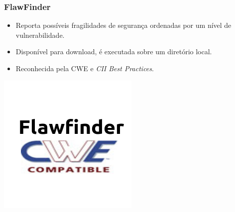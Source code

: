 \documentclass{beamer}
\begin{document}
\begin{frame}
  \frametitle{FlawFinder}

  \begin{minipage}{0.5\textwidth}\centering
    \begin{itemize}
      \item Reporta possíveis fragilidades de segurança ordenadas por um nível de vulnerabilidade.
      \item Disponível para download, é executada sobre um diretório local.
      \item Reconhecida pela CWE e
      \textit{CII Best Practices}.
    \end{itemize}
  \end{minipage}
  \hfill
  \begin{minipage}{0.4\textwidth}\raggedleft

  \includegraphics[scale=0.6]{img/flawfinder.png}

  \end{minipage}

\end{frame}
\end{document}
